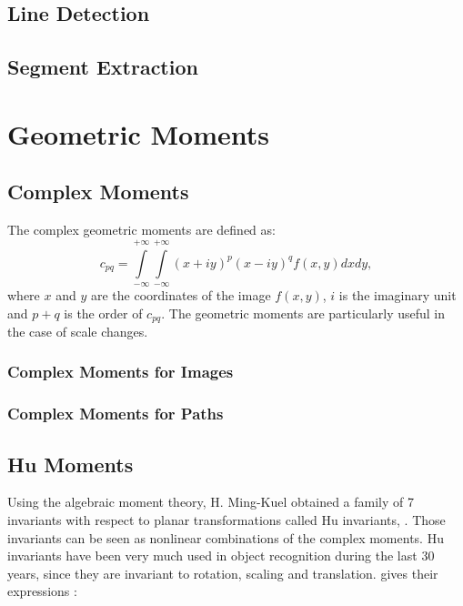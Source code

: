 \subsection{Line Detection}
\label{sec:LineDetection}






\subsection{Segment Extraction}
\label{sec:SegmentExtraction}

%
%


\section{Geometric Moments}

\subsection{Complex Moments}
\label{sec:ComplexMoments}
The complex geometric moments are defined as:
\begin {equation}
c_{pq} = \int\limits_{-\infty}^{+\infty}\int\limits_{-\infty}^{+\infty}(x + iy)^p(x- iy)^qf(x,y)dxdy,
\label{2.2}
\end{equation}
where $x$ and $y$ are the coordinates of the image $f(x,y)$, $i$ is the
imaginary unit and
$p+q$ is the order of $c_{pq}$. The geometric moments are
particularly useful in the case of scale changes.

\subsubsection{Complex Moments for Images}

\subsubsection{Complex Moments for Paths}


\subsection{Hu Moments}
\label{sec:HuMoments}
Using the algebraic moment theory, H. Ming-Kuel obtained a family of 7
invariants with respect to planar transformations called Hu invariants,
\cite{hu}. Those invariants can be seen as nonlinear combinations of
the complex moments. Hu invariants have
been very much used in object recognition during the last 30 years,
since they are invariant to rotation, scaling and translation. \cite{flusserinv} gives their expressions :

